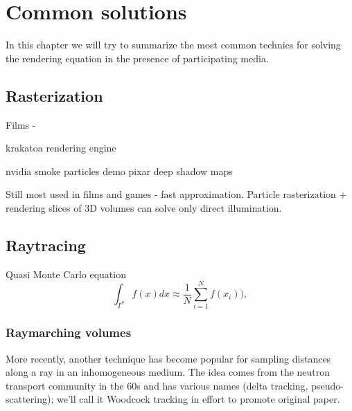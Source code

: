\chapter{Common solutions}
In this chapter we will try to summarize the most common technics for solving the rendering equation in the presence of participating media.

\section{ Rasterization}
Films - 

krakatoa rendering engine



nvidia smoke particles demo 
pixar deep shadow maps \cite{LokDSM}

Still most used in films and games - fast approximation.
Particle rasterization + rendering slices of 3D volumes can solve only direct illumination.
\section{Raytracing}
Quasi Monte Carlo equation
\begin{equation*}
\int _{I^{S}}f(x)dx\approx\frac{1}{N}\sum_{i=1}^{N}f(x_{i})),
\end{equation*}
\subsection{Raymarching volumes}
More recently, another technique has become popular for sampling distances along a ray in an inhomogeneous medium. The idea comes from the neutron transport community in the 60s and has various names (delta tracking, pseudo-scattering); we’ll call it Woodcock tracking in effort to promote original paper.


